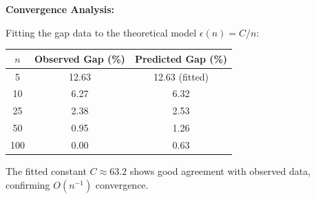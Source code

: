\documentclass{oqireport}
\begin{document}
\textbf{Convergence Analysis:}

Fitting the gap data to the theoretical model $\epsilon(n) = C/n$:

\begin{center}
\begin{tabular}{ccc}
\hline
$n$ & Observed Gap (\%) & Predicted Gap (\%) \\
\hline
5 & 12.63 & 12.63 (fitted) \\
10 & 6.27 & 6.32 \\
25 & 2.38 & 2.53 \\
50 & 0.95 & 1.26 \\
100 & 0.00 & 0.63 \\
\hline
\end{tabular}
\end{center}

The fitted constant $C \approx 63.2$ shows good agreement with observed data, confirming $O(n^{-1})$ convergence.













\end{document}
